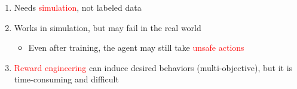 \documentclass[8pt, aspectratio=169]{beamer} %
\begin{document}
\begin{frame}{\insertsubsectionhead}

  \begin{enumerate}
    \item<1-> Needs \textcolor{red}{simulation}, not labeled data
    \item<2-> Works in simulation, but may fail in the real world
      \begin{itemize}
        \item<2-> Even after training, the agent may still take \textcolor{red}{unsafe actions}
      \end{itemize}
    \item<3-> \textcolor{red}{Reward engineering} can induce desired behaviors (multi-objective), but it is time-consuming and difficult
  \end{enumerate}

\end{frame}





\end{document}
